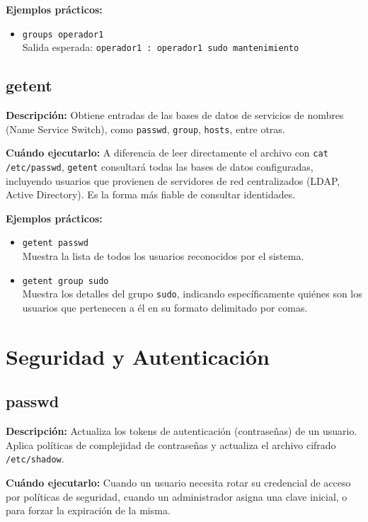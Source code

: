 \documentclass[11pt, a4paper]{article}
\begin{document}
\textbf{Ejemplos prácticos:}
\begin{itemize}
    \item \texttt{groups operador1} \\
    Salida esperada: \texttt{operador1 : operador1 sudo mantenimiento}
\end{itemize}

\subsection{getent}
\textbf{Descripción:} Obtiene entradas de las bases de datos de servicios de nombres (Name Service Switch), como \texttt{passwd}, \texttt{group}, \texttt{hosts}, entre otras. 

\textbf{Cuándo ejecutarlo:} A diferencia de leer directamente el archivo con \texttt{cat /etc/passwd}, \texttt{getent} consultará todas las bases de datos configuradas, incluyendo usuarios que provienen de servidores de red centralizados (LDAP, Active Directory). Es la forma más fiable de consultar identidades.

\textbf{Ejemplos prácticos:}
\begin{itemize}
    \item \texttt{getent passwd} \\
    Muestra la lista de todos los usuarios reconocidos por el sistema.
    \item \texttt{getent group sudo} \\
    Muestra los detalles del grupo \texttt{sudo}, indicando específicamente quiénes son los usuarios que pertenecen a él en su formato delimitado por comas.
\end{itemize}

\section{Seguridad y Autenticación}

\subsection{passwd}
\textbf{Descripción:} Actualiza los tokens de autenticación (contraseñas) de un usuario. Aplica políticas de complejidad de contraseñas y actualiza el archivo cifrado \texttt{/etc/shadow}.

\textbf{Cuándo ejecutarlo:} Cuando un usuario necesita rotar su credencial de acceso por políticas de seguridad, cuando un administrador asigna una clave inicial, o para forzar la expiración de la misma.
\end{document}
